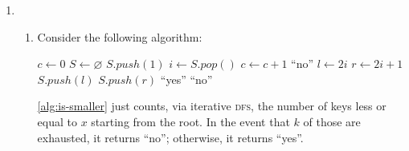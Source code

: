 \documentclass[10pt, letterpaper]{article}
\begin{document}

\begin{enumerate}[label={\bfseries Q\arabic*.}]
  \item
    \begin{enumerate}
      \item
        Consider the following algorithm:
        \vspace{-5mm}
        \begin{center}
          \begin{minipage}{\linewidth}
            \begin{algorithm}[H]
              \caption{$\textsc{Is-Smaller}(A,x,k)$}\label{alg:is-smaller}
              \begin{algorithmic}[1]
                \State $c \gets 0$ 
                \State $S \gets \varnothing$ 
                \State $S.push(1)$ 
                  \State $i \gets S.pop()$
                    \State $c \gets c + 1$
                      \State \Return ``no''
                    \EndIf
                    \State $l \gets 2i$
                    \State $r \gets 2i + 1$
                      \State $S.push(l)$
                    \EndIf
                      \State $S.push(r)$
                    \EndIf
                  \EndIf
                \EndWhile
                  \State \Return ``yes''
                \Else
                  \State \Return ``no''
                \EndIf
              \end{algorithmic}
            \end{algorithm}
          \end{minipage}
        \end{center}

        \autoref{alg:is-smaller} just counts, via iterative \textsc{dfs}, the number of keys
        less or equal to $x$ starting from the root. In the event that $k$ of those are
        exhausted, it returns ``no''; otherwise, it returns ``yes''.


\end{enumerate}
\end{enumerate}
\end{document}
